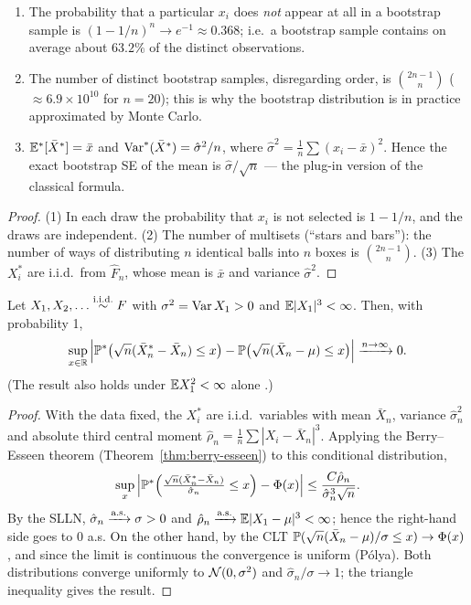 \documentclass[main.tex]{subfiles}
\begin{document}
\begin{proposition}\label{prop:boot-yapi}
\begin{enumerate}
  \item The probability that a particular $x_i$ does \emph{not} appear at all in a bootstrap sample is $(1-1/n)^n\to e^{-1}\approx0.368$; i.e.\ a bootstrap sample contains on average about $63.2\%$ of the distinct observations.
  \item The number of distinct bootstrap samples, disregarding order, is $\binom{2n-1}{n}$ ($\approx6.9\times10^{10}$ for $n=20$); this is why the bootstrap distribution is in practice approximated by Monte Carlo.
  \item $\E^*[\bar X^*]=\bar x$ and $\Var^*(\bar X^*)=\hat\sigma^2/n$, where $\hat\sigma^2=\frac1n\sum(x_i-\bar x)^2$. Hence the exact bootstrap SE of the mean is $\hat\sigma/\sqrt n$ --- the plug-in version of the classical formula.
\end{enumerate}
\end{proposition}
\begin{proof}
(1) In each draw the probability that $x_i$ is not selected is $1-1/n$, and the draws are independent. (2) The number of multisets (``stars and bars''): the number of ways of distributing $n$ identical balls into $n$ boxes is $\binom{2n-1}{n}$. (3) The $X_i^*$ are i.i.d.\ from $\hat F_n$, whose mean is $\bar x$ and variance $\hat\sigma^2$.
\end{proof}

\begin{theorem}\label{thm:boot-tutarli}
Let $X_1,X_2,\dots\iid F$ with $\sigma^2=\Var X_1>0$ and $\E|X_1|^3<\infty$. Then, with probability 1,
\[
\sup_{x\in\R}\Big|\P^*\big(\sqrt n(\bar X_n^*-\bar X_n)\le x\big)-\P\big(\sqrt n(\bar X_n-\mu)\le x\big)\Big|\xrightarrow{n\to\infty}0 .
\]
(The result also holds under $\E X_1^2<\infty$ alone \cite{bickel81,singh81}.)
\end{theorem}
\begin{proof}
With the data fixed, the $X_i^*$ are i.i.d.\ variables with mean $\bar X_n$, variance $\hat\sigma_n^2$ and absolute third central moment $\hat\rho_n=\frac1n\sum|X_i-\bar X_n|^3$. Applying the Berry--Esseen theorem (Theorem~\ref{thm:berry-esseen}) to this conditional distribution,
\[
\sup_x\Big|\P^*\Big(\tfrac{\sqrt n(\bar X^*_n-\bar X_n)}{\hat\sigma_n}\le x\Big)-\Phi(x)\Big|\le\frac{C\hat\rho_n}{\hat\sigma_n^3\sqrt n}.
\]
By the SLLN, $\hat\sigma_n\asto\sigma>0$ and $\hat\rho_n\asto\E|X_1-\mu|^3<\infty$; hence the right-hand side goes to $0$ a.s. On the other hand, by the CLT $\P(\sqrt n(\bar X_n-\mu)/\sigma\le x)\to\Phi(x)$, and since the limit is continuous the convergence is uniform (Pólya). Both distributions converge uniformly to $\Normal(0,\sigma^2)$ and $\hat\sigma_n/\sigma\to1$; the triangle inequality gives the result.
\end{proof}
\end{document}
